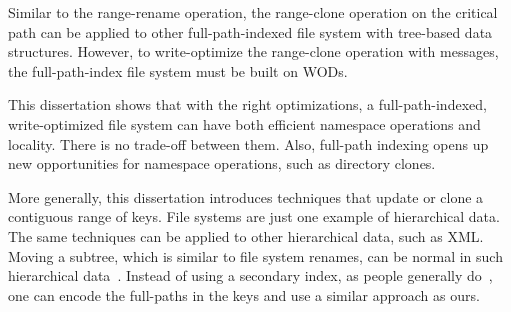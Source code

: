 Similar to the range-rename operation, the range-clone operation on the critical
path can be applied to other full-path-indexed file system with tree-based
data structures.
However, to write-optimize the range-clone operation with \goto messages,
the full-path-index file system must be built on WODs.

This dissertation shows that with the right optimizations, a full-path-indexed,
write-optimized file system can
have both efficient namespace operations and locality.
There is no trade-off between them.
Also, full-path indexing opens up new opportunities for namespace operations,
such as directory clones.

More generally, this dissertation introduces techniques that update or clone
a contiguous range of keys.
File systems are just one example of hierarchical data.
The same techniques can be applied to other hierarchical data, such as XML.
Moving a subtree, which is similar to file system renames,
can be normal in such hierarchical data~\cite{orderindex}.
Instead of using a secondary index, as people generally do~\cite{orderindex},
one can encode the full-paths in the keys and use a similar approach as ours.


